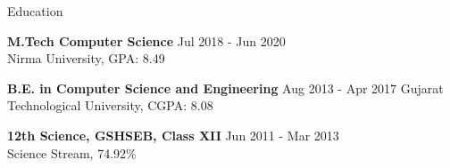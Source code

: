 \documentclass{resume} %
\begin{document}

\begin{rSection}{Education}

{\bf M.Tech Computer Science} \hfill {Jul 2018 - Jun 2020 }
\\ 
Nirma University, GPA: 8.49

{\bf B.E. in Computer Science and Engineering} \hfill {Aug 2013 - Apr 2017 }
Gujarat Technological University, CGPA: 8.08

{\textbf{12th Science, GSHSEB, Class XII}}  \hfill {Jun 2011 - Mar 2013 }\\
Science Stream, 74.92\% 
 


\end{rSection}
\end{document}

